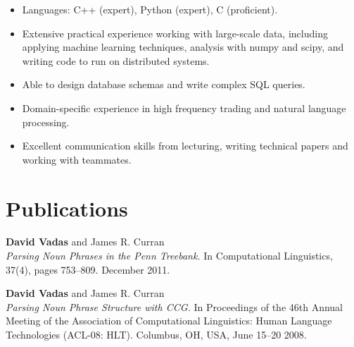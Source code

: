 \documentclass[]{article}
\begin{document}
\begin{itemize}[noitemsep,topsep=0pt]
\item {Languages: C++ (expert), Python (expert), C (proficient).}
\item {Extensive practical experience working with large-scale data, including applying machine learning techniques,
	analysis with numpy and scipy, and writing code to run on distributed systems.}
\item {Able to design database schemas and write complex SQL queries.} 
\item {Domain-specific experience in high frequency trading and natural language processing.}
\item {Excellent communication skills from lecturing, writing technical papers and working with teammates.}
\end{itemize}

\newpage

\section*{Publications}

\textbf{David Vadas} and James R. Curran\\
\textit{Parsing Noun Phrases in the Penn Treebank.}
In Computational Linguistics, 37(4), pages 753--809.
December 2011.

\vbox{}

\textbf{David Vadas} and James R. Curran\\
\textit{Parsing Noun Phrase Structure with {CCG}.}
In Proceedings of the 46th Annual Meeting of the Association of Computational
Linguistics: Human Language Technologies (ACL-08: HLT).
Columbus, OH, USA, June 15--20 2008.
\end{document}
